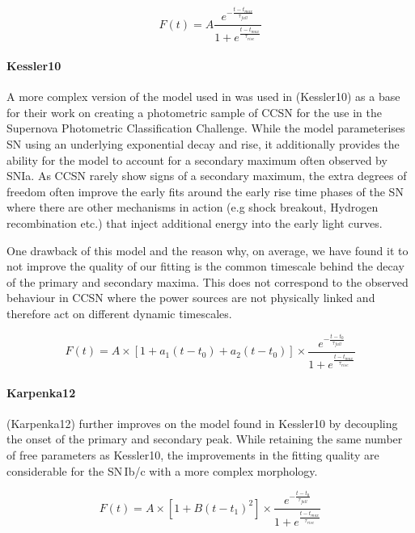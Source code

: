 \begin{equation}
\label{eq:Bazin09}
  F(t) = A \frac{e^{-\frac{t - t_{max}}{\tau_{fall}}}} {1 + e^{\frac{t - t_{max}}{\tau_{rise}}}}
\end{equation}

\paragraph{Kessler10}
A more complex version of the model used in \citet{Bazin2009} was used in \citet{Kessler2010} (Kessler10) as a base for their work on creating a photometric sample of CCSN for the use in the Supernova Photometric Classification Challenge. While the model parameterises SN using an underlying exponential decay and rise, it additionally provides the ability for the model to account for a secondary maximum often observed by SNIa. As CCSN rarely show signs of a secondary maximum, the extra degrees of freedom often improve the early fits around the early rise time phases of the SN where there are other mechanisms in action (e.g shock breakout, Hydrogen recombination etc.) that inject additional energy into the early light curves.

One drawback of this model and the reason why, on average, we have found it to not improve the quality of our fitting is the common timescale behind the decay of the primary and secondary maxima. This does not correspond to the observed behaviour in CCSN where the power sources are not physically linked and therefore act on different dynamic timescales.

\begin{equation}
  F(t) = A \times [1 + a_1(t - {t_0}) + a_2(t - {t_0})] \times \frac{e^{-\frac{t - t_{0}}{\tau_{fall}}}} {1 + e^{\frac{t - t_{max}}{\tau_{rise}}}}
\end{equation}

\paragraph{Karpenka12}
\citet{Karpenka2012} (Karpenka12) further improves on the model found in Kessler10 by decoupling the onset of the primary and secondary peak. While retaining the same number of free parameters as Kessler10, the improvements in the fitting quality are considerable for the SN\,Ib/c with a more complex morphology.

\begin{equation}
  F(t) = A \times [1 + B(t - {t_1})^2] \times \frac{e^{-\frac{t - t_{0}}{\tau_{fall}}}} {1 + e^{\frac{t - t_{max}}{\tau_{rise}}}}
\end{equation}

